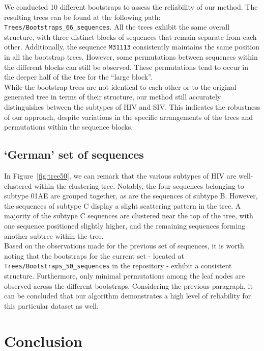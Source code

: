 \documentclass[english,13pt,a4paper]{article}
\theoremstyle{definition}
\theoremstyle{remark}
\theoremstyle{defstyle}
\begin{document}
We conducted 10 different bootstraps to assess the reliability of our method. The resulting trees can be found at the following path: \texttt{Trees/Bootstraps\_66\_sequences}. All the trees exhibit the same overall structure, with three distinct blocks of sequences that remain separate from each other. Additionally, the sequence \texttt{M31113} consistently maintains the same position in all the bootstrap trees. However, some permutations between sequences within the different blocks can still be observed. These permutations tend to occur in the deeper half of the tree for the ``large block''.\\

While the bootstrap trees are not identical to each other or to the original generated tree in terms of their structure, our method still accurately distinguishes between the subtypes of HIV and SIV. This indicates the robustness of our approach, despite variations in the specific arrangements of the trees and permutations within the sequence blocks.


\subsection{`German' set of sequences}

In Figure~\ref{fig:tree50}, we can remark that the various subtypes of HIV are well-clustered within the clustering tree. Notably, the four sequences belonging to subtype 01AE are grouped together, as are the sequences of subtype B. However, the sequences of subtype C display a slight scattering pattern in the tree. A majority of the subtype C sequences are clustered near the top of the tree, with one sequence positioned slightly higher, and the remaining sequences forming another subtree within the tree.\\

Based on the observations made for the previous set of sequences, it is worth noting that the bootstraps for the current set - located at \texttt{Trees/Bootstraps\_50\_sequences} in the repository - exhibit a consistent structure. Furthermore, only minimal permutations among the leaf nodes are observed across the different bootstraps. Considering the previous paragraph, it can be concluded that our algorithm demonstrates a high level of reliability for this particular dataset as well.

\section{Conclusion}
\end{document}
